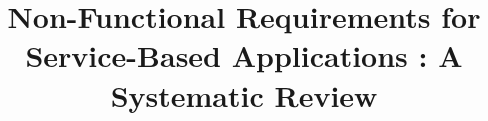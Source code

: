 \documentclass{sig-alternate}
\begin{document}
%
 
\title{Non-Functional Requirements for Service-Based Applications : A Systematic Review}

%
%
%
%
%
\end{document}
